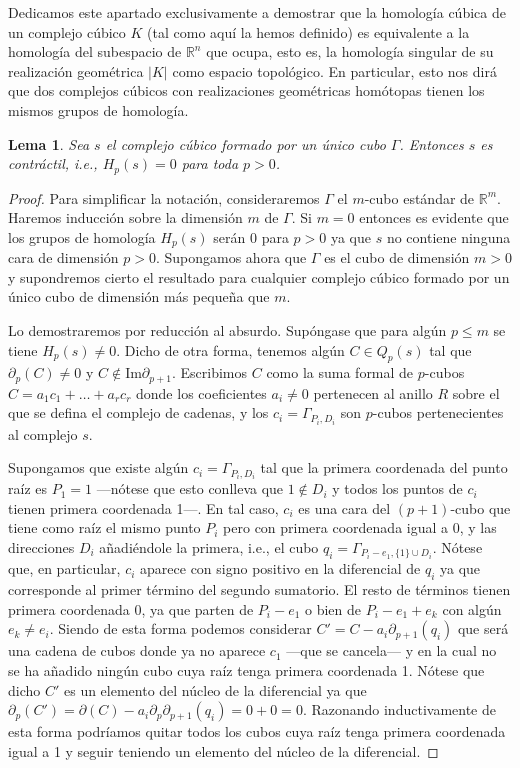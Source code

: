 \documentclass[12pt,a4paper,twoside]{article} %
\theoremstyle{plain}
\newtheorem{lema}{Lema}[subsection]
\theoremstyle{definition}
\newcommand{\R}{\mathbb{R}}
\newcommand{\geom}[1]{\lvert #1 \rvert}
\newcommand{\Img}[1]{\mathrm{Im}#1}
\begin{document}
Dedicamos este apartado exclusivamente a demostrar que la homología cúbica de un complejo cúbico $K$ (tal como aquí la hemos definido) es equivalente a la homología del subespacio de $\R^n$ que ocupa, esto es, la homología singular de su realización geométrica $\geom{K}$ como espacio topológico. En particular, esto nos dirá que dos complejos cúbicos con realizaciones geométricas homótopas tienen los mismos grupos de homología.

\begin{lema}
Sea $s$ el complejo cúbico formado por un único cubo $\Gamma$. Entonces $s$ es contráctil, i.e., $H_p(s)=0$ para toda $p>0$.
\label{lema}
\end{lema}

\begin{proof}
Para simplificar la notación, consideraremos $\Gamma$ el $m$-cubo estándar de $\R^m$. Haremos inducción sobre la dimensión $m$ de $\Gamma$. Si $m=0$ entonces es evidente que los grupos de homología $H_p(s)$ serán 0 para $p > 0$ ya que $s$ no contiene ninguna cara de dimensión $p > 0$. Supongamos ahora que $\Gamma$ es el cubo de dimensión $m>0$ y supondremos cierto el resultado para cualquier complejo cúbico formado por un único cubo de dimensión más pequeña que $m$.

Lo demostraremos por reducción al absurdo. Supóngase que para algún $p \leq m$ se tiene $H_p(s) \neq 0$. Dicho de otra forma, tenemos algún $C \in Q_p(s)$ tal que $\partial_p(C) \neq 0$ y $C \notin \Img{\partial_{p+1}}$. Escribimos $C$ como la suma formal de $p$-cubos $C=a_1 c_1+\dots+a_r c_r$ donde los coeficientes $a_i \neq 0$ pertenecen al anillo $R$ sobre el que se defina el complejo de cadenas, y los $c_i=\Gamma_{P_i,D_i}$ son $p$-cubos pertenecientes al complejo $s$. 

Supongamos que existe algún $c_i=\Gamma_{P_i,D_i}$ tal que la primera coordenada del punto raíz es $P_1 = 1$ ---nótese que esto conlleva que $1 \notin D_i$ y todos los puntos de $c_i$ tienen primera coordenada 1---. En tal caso, $c_i$ es una cara del $(p+1)$-cubo que tiene como raíz el mismo punto $P_i$ pero con primera coordenada igual a 0, y las direcciones $D_i$ añadiéndole la primera, i.e., el cubo $q_i=\Gamma_{P_i-e_1,\{1\} \cup D_i}$. Nótese que, en particular, $c_i$ aparece con signo positivo en la diferencial de $q_i$ ya que corresponde al primer término del segundo sumatorio. El resto de términos tienen primera coordenada 0, ya que parten de $P_i-e_1$ o bien de $P_i-e_1+e_k$ con algún $e_k \neq e_i$. Siendo de esta forma podemos considerar $C' = C - a_i \partial_{p+1} (q_i)$ que será una cadena de cubos donde ya no aparece $c_1$ ---que se cancela--- y en la cual no se ha añadido ningún cubo cuya raíz tenga primera coordenada 1. Nótese que dicho $C'$ es un elemento del núcleo de la diferencial ya que $\partial_p(C') = \partial(C) - a_i \partial_p\partial_{p+1}(q_i)=0+0=0$. Razonando inductivamente de esta forma podríamos quitar todos los cubos cuya raíz tenga primera coordenada igual a 1 y seguir teniendo un elemento del núcleo de la diferencial.


\end{proof}
\end{document}
